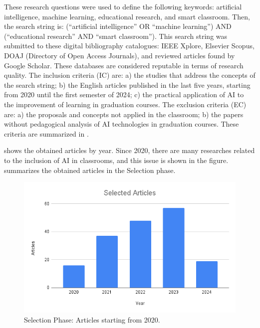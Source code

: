 \documentclass[english]{textolivre}
\begin{document}
These research questions were used to define the following keywords:
artificial intelligence, machine learning, educational research, and
smart classroom. Then, the search string is: (``artificial
intelligence'' OR ``machine learning'') AND (``educational research''
AND ``smart classroom''). This search string was submitted to these
digital bibliography catalogues: IEEE Xplore, Elsevier Scopus, DOAJ
(Directory of Open Access Journals), and reviewed articles found by
Google Scholar. These databases are considered reputable in terms of
research quality. The inclusion criteria (IC) are: a) the studies that
address the concepts of the search string; b) the English articles
published in the last five years, starting from 2020 until the first
semester of 2024; c) the practical application of AI to the improvement
of learning in graduation courses. The exclusion criteria (EC) are: a)
the proposals and concepts not applied in the classroom; b) the papers
without pedagogical analysis of AI technologies in graduation courses.
These criteria are summarized in .

 shows the obtained articles by year. Since 2020, there are many
researches related to the inclusion of AI in classrooms, and this issue
is shown in the figure.  summarizes the obtained articles in the
Selection phase.


\begin{figure}[htbp]
\centering
\begin{minipage}{.75\textwidth}
  \includegraphics[width=\textwidth]{figure02.png}
  \caption{Selection Phase: Articles starting from 2020.}
  \label{fig02}
\end{minipage}
\end{figure}
\end{document}

